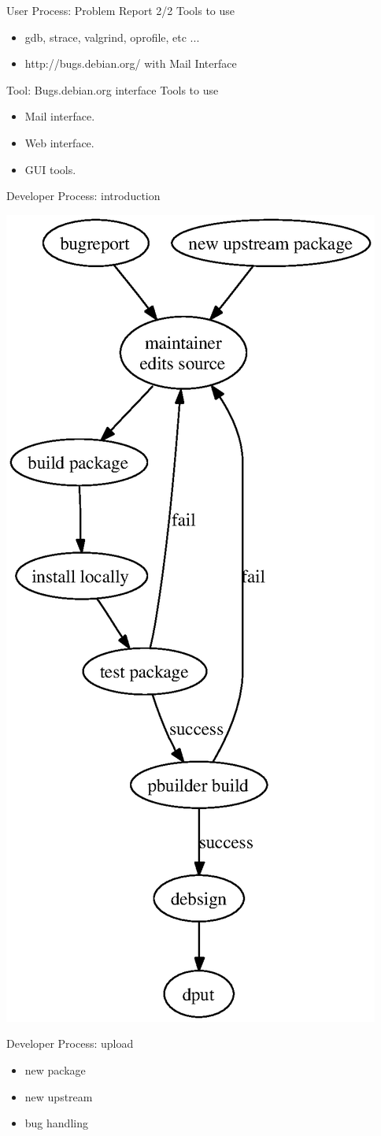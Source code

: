 \documentclass[cjk,dvipdfm,12pt]{beamer}
\begin{document}
\begin{frame}{User Process: Problem Report 2/2}
Tools to use 
\begin{itemize}
 \item gdb, strace, valgrind, oprofile, etc ... 
 \item http://bugs.debian.org/ with Mail Interface
\end{itemize} 
\end{frame}

\begin{frame}{Tool: Bugs.debian.org interface}
Tools to use 
\begin{itemize}
 \item Mail interface.
 \item Web interface.
 \item GUI tools.
\end{itemize} 
\end{frame}

\begin{frame}{Developer Process: introduction}

 \includegraphics[width=0.5\hsize]{image200705/develcycle.eps}
\end{frame}

\begin{frame}{Developer Process: upload}

 \begin{itemize}
  \item new package 
  \item new upstream
  \item bug handling 
 \end{itemize}
\end{frame}
\end{document}
